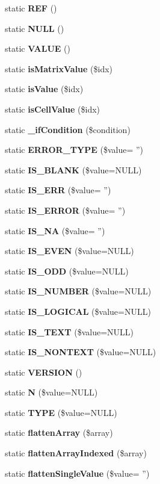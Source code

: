 \begin{DoxyCompactItemize}
\item 
static {\bfseries R\+E\+F} ()\label{class_p_h_p_excel___calculation___functions_a57dca31978b72792e744bf4b711673bc}

\item 
static {\bfseries N\+U\+L\+L} ()\label{class_p_h_p_excel___calculation___functions_a91a5a1066d3876aada829d106ede64d6}

\item 
static {\bfseries V\+A\+L\+U\+E} ()\label{class_p_h_p_excel___calculation___functions_a2cc495b625ec296fd11527f968a37698}

\item 
static {\bfseries is\+Matrix\+Value} (\$idx)\label{class_p_h_p_excel___calculation___functions_afd0dfd012a0eff1f454d4c9ebfb1fd95}

\item 
static {\bfseries is\+Value} (\$idx)\label{class_p_h_p_excel___calculation___functions_ac4a74502fedb406db402e2358e3e0d66}

\item 
static {\bfseries is\+Cell\+Value} (\$idx)\label{class_p_h_p_excel___calculation___functions_a4c7ac49d2bed94232f736f219e23bedb}

\item 
static {\bfseries \+\_\+if\+Condition} (\$condition)\label{class_p_h_p_excel___calculation___functions_aacd32a2e00680ed961bf5225616994a6}

\item 
static {\bf E\+R\+R\+O\+R\+\_\+\+T\+Y\+P\+E} (\$value= '')
\item 
static {\bf I\+S\+\_\+\+B\+L\+A\+N\+K} (\$value=N\+U\+L\+L)
\item 
static {\bf I\+S\+\_\+\+E\+R\+R} (\$value= '')
\item 
static {\bf I\+S\+\_\+\+E\+R\+R\+O\+R} (\$value= '')
\item 
static {\bf I\+S\+\_\+\+N\+A} (\$value= '')
\item 
static {\bf I\+S\+\_\+\+E\+V\+E\+N} (\$value=N\+U\+L\+L)
\item 
static {\bf I\+S\+\_\+\+O\+D\+D} (\$value=N\+U\+L\+L)
\item 
static {\bf I\+S\+\_\+\+N\+U\+M\+B\+E\+R} (\$value=N\+U\+L\+L)
\item 
static {\bf I\+S\+\_\+\+L\+O\+G\+I\+C\+A\+L} (\$value=N\+U\+L\+L)
\item 
static {\bf I\+S\+\_\+\+T\+E\+X\+T} (\$value=N\+U\+L\+L)
\item 
static {\bf I\+S\+\_\+\+N\+O\+N\+T\+E\+X\+T} (\$value=N\+U\+L\+L)
\item 
static {\bf V\+E\+R\+S\+I\+O\+N} ()
\item 
static {\bf N} (\$value=N\+U\+L\+L)
\item 
static {\bf T\+Y\+P\+E} (\$value=N\+U\+L\+L)
\item 
static {\bf flatten\+Array} (\$array)
\item 
static {\bf flatten\+Array\+Indexed} (\$array)
\item 
static {\bf flatten\+Single\+Value} (\$value= '')
\end{DoxyCompactItemize}
